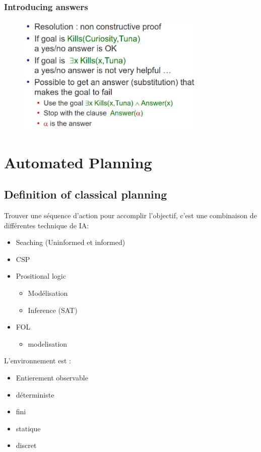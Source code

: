 \documentclass[12pt]{article}
\begin{document}
		\subsubsection{Introducing answers}
		
			\begin{figure}[htp]	
				\centering
				\includegraphics[width=0.8\textwidth]{img/RIR2.png}
			\end{figure}
			
			
\newpage
\section{Automated Planning}
	\subsection{Definition of classical planning}
		Trouver une séquence d'action pour accomplir l'objectif, c'est une combinaison de différentes technique de IA:
		\begin{itemize}
			\item Seaching (Uninformed et informed)
			\item CSP
			\item Prositional logic
			\begin{itemize}
				\item Modélisation
				\item Inference (SAT)
			\end{itemize}
			\item FOL
			\begin{itemize}
				\item modelisation
			\end{itemize}
		\end{itemize}
		
		L'environnement est :
		\begin{itemize}
			\item Entierement observable
			\item déterministe 
			\item fini
			\item statique
			\item discret
		\end{itemize}
		
\end{document}
